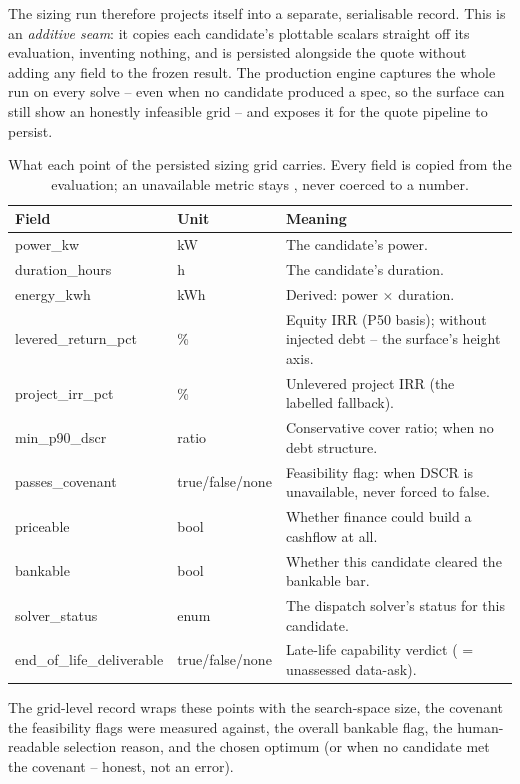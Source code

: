 The sizing run therefore projects itself into a separate, serialisable  record. This is an \emph{additive seam}: it copies each candidate's plottable scalars straight off its evaluation, inventing nothing, and is persisted alongside the quote without adding any field to the frozen result. The production engine captures the whole run on every solve -- even when no candidate produced a spec, so the surface can still show an honestly infeasible grid -- and exposes it for the quote pipeline to persist.

\begin{table}[H]
\centering
\caption{What each point of the persisted sizing grid carries. Every field is copied from the evaluation; an unavailable metric stays , never coerced to a number.}
\label{tab:gridpoint}
\small\sffamily
\begin{tabularx}{\textwidth}{@{}l l L@{}}
\toprule
\textbf{Field} & \textbf{Unit} & \textbf{Meaning} \\
\midrule
power\_kw & kW & The candidate's power. \\
duration\_hours & h & The candidate's duration. \\
energy\_kwh & kWh & Derived: power $\times$ duration. \\
levered\_return\_pct & \% & Equity IRR (P50 basis);  without injected debt -- the surface's height axis. \\
project\_irr\_pct & \% & Unlevered project IRR (the labelled fallback). \\
min\_p90\_dscr & ratio & Conservative cover ratio;  when no debt structure. \\
passes\_covenant & true/false/none & Feasibility flag:  when DSCR is unavailable, never forced to false. \\
priceable & bool & Whether finance could build a cashflow at all. \\
bankable & bool & Whether this candidate cleared the bankable bar. \\
solver\_status & enum & The dispatch solver's status for this candidate. \\
end\_of\_life\_deliverable & true/false/none & Late-life capability verdict ( = unassessed data-ask). \\
\bottomrule
\end{tabularx}
\end{table}

The grid-level record wraps these points with the search-space size, the covenant the feasibility flags were measured against, the overall bankable flag, the human-readable selection reason, and the chosen optimum (or  when no candidate met the covenant -- honest, not an error).

